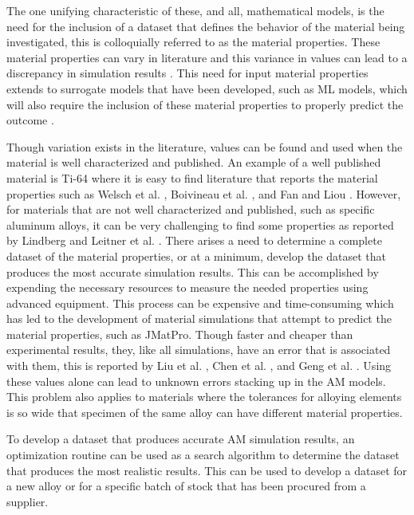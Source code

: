 The one unifying characteristic of these, and all, mathematical models, is the need for the inclusion of a dataset that defines the behavior of the material being investigated, this is colloquially referred to as the material properties.  These material properties can vary in literature and this variance in values can lead to a discrepancy in simulation results \cite{daryabeigiThermalPropertiesAccurate2011}.
This need for input material properties extends to surrogate models that have been developed, such as \ac{ML} models, which will also require the inclusion of these material properties to properly predict the outcome \cite{zhuMachineLearningMetal2020, zobeiryPhysicsinformedMachineLearning2021, mengMachineLearningAdditive2020, wangMachineLearningAdditive2020}.

Though variation exists in the literature, values can be found and used when the material is well characterized and published.  An example of a well published material is Ti-64 where it is easy to find literature that reports the material properties such as Welsch et al. \cite{welschgerhard_1993}, Boivineau et al. \cite{boivineau_2006}, and Fan and Liou \cite{fan_2012}.  However, for materials that are not well characterized and published, such as specific aluminum alloys, it can be very challenging to find some properties as reported by Lindberg \cite{lundberg_material_1994} and Leitner et al. \cite{leitner_thermophysical_2017}.  There arises a need to determine a complete dataset of the material properties, or at a minimum, develop the dataset that produces the most accurate simulation results. 
This can be accomplished by expending the necessary resources to measure the needed properties using advanced equipment.
This process can be expensive and time-consuming which has led to the development of material simulations that attempt to predict the material properties, such as JMatPro\cite{jmatpro}.  Though faster and cheaper than experimental results, they, like all simulations, have an error that is associated with them, this is reported by Liu et al. \cite{liuStudyPredictionTensile2020}, Chen et al. \cite{chenMicrostructurePropertiesIronbased2023}, and Geng et al. \cite{gengDatadrivenMachineLearning2022}.  Using these values alone can lead to unknown errors stacking up in the \ac{AM} models.
This problem also applies to materials where the tolerances for alloying elements is so wide that specimen of the same alloy can have different material properties.  

To develop a dataset that produces accurate \ac{AM} simulation results, an optimization routine can be used as a search algorithm to determine the dataset that produces the most realistic results.  This can be used to develop a dataset for a new alloy or for a specific batch of stock that has been procured from a supplier. 



